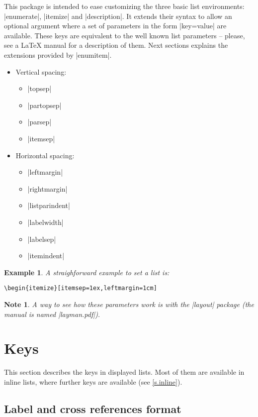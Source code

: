 \documentclass[a4paper]{ltxguide}
\newtheorem{note}{Note}
\newtheorem{example}{Example}
\newcommand\3{\unskip\enspace\fbox{\fontsize{4}{4}\selectfont NEW 3.0}}
\begin{document}
This package is intended to ease customizing the three basic list
environments: |enumerate|, |itemize| and |description|. It extends
their syntax to allow an optional argument where a set of parameters in
the form |key=value| are available. These keys are equivalent to the
well known list parameters -- please, see a \LaTeX{} manual for a
description of them. Next sections explains the extensions provided by
|enumitem|.
\begin{itemize}
\item
Vertical spacing:
\begin{itemize}
\item |topsep|
\item |partopsep|
\item |parsep|
\item |itemsep|
\end{itemize}
\item
Horizontal spacing:
\begin{itemize}
\item |leftmargin|
\item |rightmargin|
\item |listparindent|
\item |labelwidth|
\item |labelsep|
\item |itemindent|
\end{itemize}
\end{itemize}

\begin{example}
  A straighforward example to set a list is:
\begin{verbatim}
\begin{itemize}[itemsep=1ex,leftmargin=1cm]
\end{verbatim}
\end{example}

\begin{note}
  A way to see how these parameters work is with the |layout| package
  (the manual is named |layman.pdf|).
\end{note}

\section{Keys}

This section describes the keys in displayed lists. Most of them are
available in inline lists, where further keys are available (see
\ref{s.inline}).

\subsection{Label and cross references format}
\end{document}
